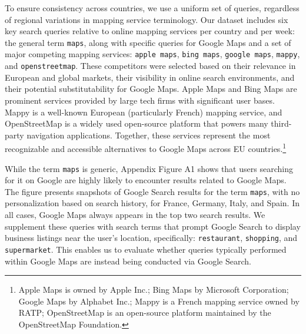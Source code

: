 \documentclass[11pt]{article}
\begin{document}
	
	To ensure consistency across countries, we use a uniform set of queries, regardless of regional variations in mapping service terminology. Our dataset includes six key search queries relative to online mapping services per country and per week: the general term \texttt{maps}, along with specific queries for Google Maps and a set of major competing mapping services: \texttt{apple maps}, \texttt{bing maps}, \texttt{google maps}, \texttt{mappy}, and \texttt{openstreetmap}. These competitors were selected based on their relevance in European and global markets, their visibility in online search environments, and their potential substitutability for Google Maps. Apple Maps and Bing Maps are prominent services provided by large tech firms with significant user bases. Mappy is a well-known European (particularly French) mapping service, and OpenStreetMap is a widely used open-source platform that powers many third-party navigation applications. Together, these services represent the most recognizable and accessible alternatives to Google Maps across EU countries.\footnote{Apple Maps is owned by Apple Inc.; Bing Maps by Microsoft Corporation; Google Maps by Alphabet Inc.; Mappy is a French mapping service owned by RATP; OpenStreetMap is an open-source platform maintained by the OpenStreetMap Foundation.}
	
	While the term \texttt{maps} is generic, Appendix Figure A1 shows that users searching for it on Google are highly likely to encounter results related to Google Maps. The figure presents snapshots of Google Search results for the term \texttt{maps}, with no personalization based on search history, for France, Germany, Italy, and Spain. In all cases, Google Maps always appears in the top two search results. We supplement these queries with search terms that prompt Google Search to display business listings near the user's location, specifically: \texttt{restaurant}, \texttt{shopping}, and \texttt{supermarket}. This enables us to evaluate whether queries typically performed within Google Maps are instead being conducted via Google Search.
	
\end{document}
